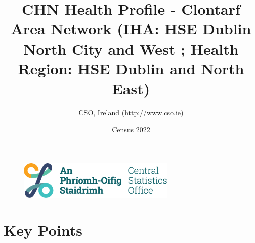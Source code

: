 \documentclass{article}
\title{CHN Health Profile - Clontarf Area Network (IHA: HSE Dublin North City and West ;  Health Region: HSE Dublin and North East) }
\date{Census 2022}
\author{CSO, Ireland  (\url{http://www.cso.ie)}}
\begin{document}


\begin{figure}
	\centering
\includegraphics[width =75mm]{../figures/CSO_Logo.png}
\end{figure}

				 
		   
						  
														  
																																													
												 
			 
\maketitle
					
													   
				 
						 
																																																																											   
				 
				  
  \pagebreak
    	    \tableofcontents

\pagebreak


\section{Key Points}
\end{document}

